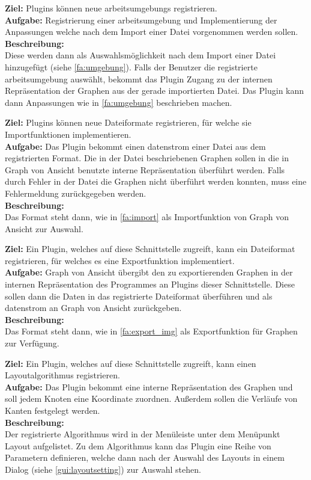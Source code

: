 \label{s:umgebung}
\textbf{Ziel:} Plugins können neue \glspl{arbeitsumgebung} registrieren.\\
\textbf{Aufgabe:}
Registrierung einer \gls{arbeitsumgebung} und Implementierung der Anpassungen welche nach dem Import einer Datei vorgenommen werden sollen.\\
\textbf{Beschreibung:}\\
Diese werden dann als Auswahlsmöglichkeit nach dem Import einer Datei hinzugefügt (siehe \ref{fa:umgebung}).
Falls der Benutzer die registrierte \gls{arbeitsumgebung} auswählt, bekommt das Plugin Zugang zu der internen Repräsentation der Graphen aus der gerade importierten Datei. Das Plugin kann dann Anpassungen wie in \ref{fa:umgebung} beschrieben machen.

\label{s:import}
\textbf{Ziel:} Plugins können neue Dateiformate registrieren, für welche sie Importfunktionen implementieren.\\
\textbf{Aufgabe:}
Das Plugin bekommt einen \gls{datenstrom} einer Datei aus dem registrierten Format. Die in der Datei beschriebenen Graphen sollen in die in Graph von Ansicht benutzte interne Repräsentation überführt werden. Falls durch Fehler in der Datei die Graphen nicht überführt werden konnten, muss eine Fehlermeldung zurückgegeben werden.\\
\textbf{Beschreibung:}\\
Das Format steht dann, wie in \ref{fa:import} als Importfunktion von Graph von Ansicht zur Auswahl.

\label{s:export}
\textbf{Ziel:} Ein Plugin, welches auf diese Schnittstelle zugreift, kann ein Dateiformat registrieren, für welches es eine Exportfunktion implementiert.\\
\textbf{Aufgabe:}
Graph von Ansicht übergibt den zu exportierenden Graphen in der internen Repräsentation des Programmes an Plugins dieser Schnittstelle. Diese sollen dann die Daten in das registrierte Dateiformat überführen und als \gls{datenstrom} an Graph von Ansicht zurückgeben.\\
\textbf{Beschreibung:}\\
Das Format steht dann, wie in \ref{fa:export_img} als Exportfunktion für Graphen zur Verfügung.

\label{layoutalgo}
\textbf{Ziel:} Ein Plugin, welches auf diese Schnittstelle zugreift, kann einen Layoutalgorithmus registrieren.\\
\textbf{Aufgabe:}
Das Plugin bekommt eine interne Repräsentation des Graphen und soll jedem Knoten eine Koordinate zuordnen. Außerdem sollen die Verläufe von Kanten festgelegt werden.\\
\textbf{Beschreibung:}\\
Der registrierte Algorithmus wird in der Menüleiste unter dem Menüpunkt Layout aufgelistet.
Zu dem Algorithmus kann das Plugin eine Reihe von Parametern definieren, welche dann nach der Auswahl des Layouts in einem Dialog (siehe \ref{gui:layoutsetting}) zur Auswahl stehen.


